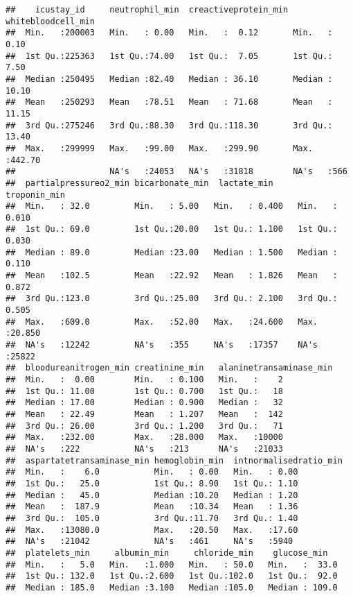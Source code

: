 \documentclass[
]{article}
\begin{document}
\begin{verbatim}
##    icustay_id     neutrophil_min  creactiveprotein_min whitebloodcell_min
##  Min.   :200003   Min.   : 0.00   Min.   :  0.12       Min.   :  0.10    
##  1st Qu.:225363   1st Qu.:74.00   1st Qu.:  7.05       1st Qu.:  7.50    
##  Median :250495   Median :82.40   Median : 36.10       Median : 10.10    
##  Mean   :250293   Mean   :78.51   Mean   : 71.68       Mean   : 11.15    
##  3rd Qu.:275246   3rd Qu.:88.30   3rd Qu.:118.30       3rd Qu.: 13.40    
##  Max.   :299999   Max.   :99.00   Max.   :299.90       Max.   :442.70    
##                   NA's   :24053   NA's   :31818        NA's   :566       
##  partialpressureo2_min bicarbonate_min  lactate_min      troponin_min   
##  Min.   : 32.0         Min.   : 5.00   Min.   : 0.400   Min.   : 0.010  
##  1st Qu.: 69.0         1st Qu.:20.00   1st Qu.: 1.100   1st Qu.: 0.030  
##  Median : 89.0         Median :23.00   Median : 1.500   Median : 0.110  
##  Mean   :102.5         Mean   :22.92   Mean   : 1.826   Mean   : 0.872  
##  3rd Qu.:123.0         3rd Qu.:25.00   3rd Qu.: 2.100   3rd Qu.: 0.505  
##  Max.   :609.0         Max.   :52.00   Max.   :24.600   Max.   :20.850  
##  NA's   :12242         NA's   :355     NA's   :17357    NA's   :25822   
##  bloodureanitrogen_min creatinine_min   alaninetransaminase_min
##  Min.   :  0.00        Min.   : 0.100   Min.   :    2          
##  1st Qu.: 11.00        1st Qu.: 0.700   1st Qu.:   18          
##  Median : 17.00        Median : 0.900   Median :   32          
##  Mean   : 22.49        Mean   : 1.207   Mean   :  142          
##  3rd Qu.: 26.00        3rd Qu.: 1.200   3rd Qu.:   71          
##  Max.   :232.00        Max.   :28.000   Max.   :10000          
##  NA's   :222           NA's   :213      NA's   :21033          
##  aspartatetransaminase_min hemoglobin_min  intnormalisedratio_min
##  Min.   :    6.0           Min.   : 0.00   Min.   : 0.00         
##  1st Qu.:   25.0           1st Qu.: 8.90   1st Qu.: 1.10         
##  Median :   45.0           Median :10.20   Median : 1.20         
##  Mean   :  187.9           Mean   :10.34   Mean   : 1.36         
##  3rd Qu.:  105.0           3rd Qu.:11.70   3rd Qu.: 1.40         
##  Max.   :13080.0           Max.   :20.50   Max.   :17.60         
##  NA's   :21042             NA's   :461     NA's   :5940          
##  platelets_min     albumin_min     chloride_min    glucose_min    
##  Min.   :   5.0   Min.   :1.000   Min.   : 50.0   Min.   :  33.0  
##  1st Qu.: 132.0   1st Qu.:2.600   1st Qu.:102.0   1st Qu.:  92.0  
##  Median : 185.0   Median :3.100   Median :105.0   Median : 109.0  

\end{verbatim}
\end{document}
